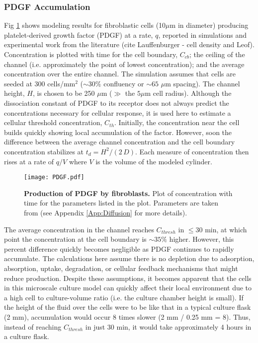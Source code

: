 \subsubsection{PDGF Accumulation}

Fig \ref{chap1:fig:PDGF} shows modeling results for fibroblastic cells (10$\mu$m in diameter) producing platelet-derived growth factor (PDGF) at a rate, $q$, reported in simulations and experimental work from the literature (cite Lauffenburger - cell density and Leof). Concentration is plotted with time for the cell boundary, $C_{cb}$; the ceiling of the channel (i.e. approximately the point of lowest concentration); and the average concentration over the entire channel. The simulation assumes that cells are seeded at 300 cells/mm$^{2}$ ($\sim 30\%$ confluency or $\sim 65$ $\mu$m spacing). The channel height, $H$, is chosen to be 250 $\mu$m ($\gg$ the $5\mu$m cell radius). Although the dissociation constant of PDGF to its receptor does not always predict the concentrations necessary for cellular response, it is used here to estimate a cellular threshold concentration, $C_{th}$. Initially, the concentration near the cell builds quickly showing local accumulation of the factor. However, soon the difference between the average channel concentration and the cell boundary concentration stabilizes at $t_{d}=H^{2}/(2\,D)$. Each measure of concentration then rises at a rate of $q/V$ where $V$ is the volume of the modeled cylinder. 


\begin{figure}[!b]
\centering
\texttt{[image: PDGF.pdf]}
\caption{\textbf{Production of PDGF by fibroblasts.} Plot of concentration with time for the parameters listed in the plot. Parameters are taken from \cite{Lauffenburger:1989fy,LEOF:1986uq} (see Appendix \ref{App:Diffusion} for more details).}
\label{chap1:fig:PDGF}
\end{figure}

The average concentration in the channel reaches $C_{thresh}$ in $\le 30$ min, at which point the concentration at the cell boundary is $\sim 35\%$ higher. However, this percent difference quickly becomes negligible as PDGF continues to rapidly accumulate. The calculations here assume there is no depletion due to adsorption, absorption, uptake, degradation, or cellular feedback mechanisms that might reduce production. Despite these assumptions, it becomes apparent that the cells in this microscale culture model can quickly affect their local environment due to a high cell to culture-volume ratio (i.e. the culture chamber height is small). If the height of the fluid over the cells were to be like that in a typical culture flask (2 mm), accumulation would occur 8 times slower (2 mm / 0.25 mm = 8). Thus, instead of reaching $C_{thresh}$ in just 30 min, it would take approximately 4 hours in a culture flask.

